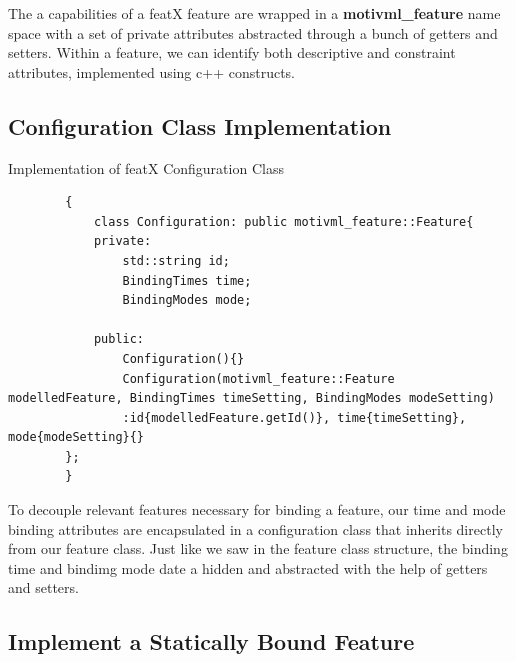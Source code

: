\documentclass{article}
\newenvironment{longlisting}{\captionsetup{type=listing}}{}
\begin{document}
The a capabilities of a featX feature are wrapped in a \textbf{motivml\_feature} name space with a set of private attributes abstracted through a bunch of getters and setters. Within a feature, we can identify both descriptive and constraint attributes, implemented using c++ constructs.

\subsection{Configuration Class Implementation}

\begin{longlisting}
	\caption{Implementation of featX Configuration Class}
	\begin{verbatim}
		{
			class Configuration: public motivml_feature::Feature{
			private:
				std::string id;
				BindingTimes time;
				BindingModes mode;
			
			public:
				Configuration(){}
				Configuration(motivml_feature::Feature modelledFeature, BindingTimes timeSetting, BindingModes modeSetting)
				:id{modelledFeature.getId()}, time{timeSetting}, mode{modeSetting}{}
		};
		}
	\end{verbatim}
	\label{config-class}
	
\end{longlisting}

To decouple relevant features necessary for binding a feature, our time and mode binding attributes are encapsulated in a configuration class that inherits directly from our feature class. Just like we saw in the feature class structure, the binding time and bindimg mode date a hidden and abstracted with the help of getters and setters.

\subsection{Implement a Statically Bound Feature}
\end{document}
